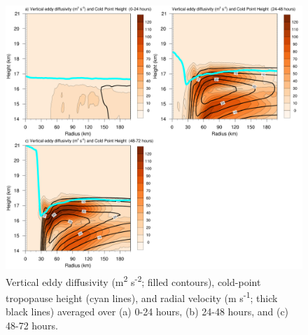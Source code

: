 \documentclass{ametsoc}
\begin{document}
\begin{figure}[ht]
\centerline{\includegraphics[width=39pc]{figures/khvten.png}}
\caption{Vertical eddy diffusivity (m\textsuperscript{2} s\textsuperscript{-2}; filled contours), cold-point tropopause height (cyan lines), and radial velocity (m s\textsuperscript{-1}; thick black lines) averaged over (a) 0-24 hours, (b) 24-48 hours, and (c) 48-72 hours.}
\label{fig:diff}
\end{figure}

\end{document}

